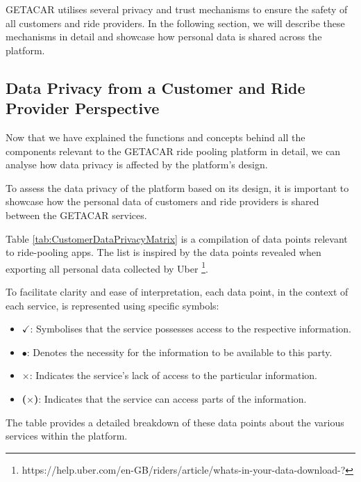 GETACAR utilises several privacy and trust mechanisms to ensure the safety of all customers and ride providers. In the following section, we will describe these mechanisms in detail and showcase how personal data is shared across the platform.

\subsection{Data Privacy from a Customer and Ride Provider Perspective}
Now that we have explained the functions and concepts behind all the components relevant to the GETACAR ride pooling platform in detail, we can analyse how data privacy is  affected by the platform's design.

To assess the data privacy of the platform based on its design, it is important to showcase how the personal data of customers and ride providers is shared between the GETACAR services.

Table \ref{tab:CustomerDataPrivacyMatrix} is a compilation of data points relevant to ride-pooling apps. The list is inspired by the data points revealed when exporting all personal data collected by Uber \footnote{https://help.uber.com/en-GB/riders/article/whats-in-your-data-download-?}.


To facilitate clarity and ease of interpretation, each data point, in the context of each service, is represented using specific symbols:

\begin{itemize}
    \item \textbf{$\checkmark$}: Symbolises that the service possesses access to the respective information.
    \item \textbf{$\bullet$}: Denotes the necessity for the information to be available to this party.
    \item \textbf{$\times$}: Indicates the service's lack of access to the particular information.
    \item \textbf{($\times$)}: Indicates that the service can access parts of the information.
\end{itemize}

The table provides a detailed breakdown of these data points about the various services within the platform.



